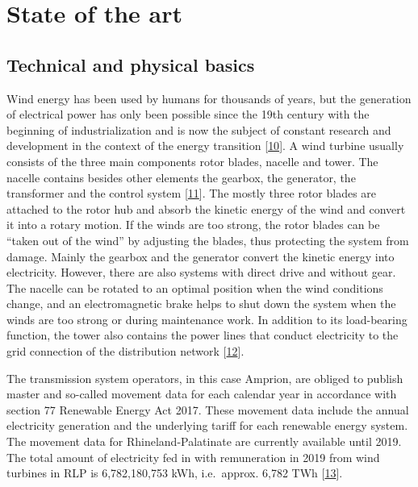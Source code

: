 \documentclass[a4paper,11pt]{article}
\begin{document}
\hypertarget{state-of-the-art}{%
\section{State of the art}\label{state-of-the-art}}

\hypertarget{technical-and-physical-basics}{%
\subsection{Technical and physical basics}\label{technical-and-physical-basics}}

Wind energy has been used by humans for thousands of years, but the generation of electrical power has only been possible since the 19th century with the beginning of industrialization and is now the subject of constant research and development in the context of the energy transition {[}\protect\hyperlink{ref-Wikipedia.2021}{10}{]}. A wind turbine usually consists of the three main components rotor blades, nacelle and tower. The nacelle contains besides other elements the gearbox, the generator, the transformer and the control system {[}\protect\hyperlink{ref-MladenBosnjakovic.2013}{11}{]}. The mostly three rotor blades are attached to the rotor hub and absorb the kinetic energy of the wind and convert it into a rotary motion. If the winds are too strong, the rotor blades can be ``taken out of the wind'' by adjusting the blades, thus protecting the system from damage. Mainly the gearbox and the generator convert the kinetic energy into electricity. However, there are also systems with direct drive and without gear. The nacelle can be rotated to an optimal position when the wind conditions change, and an electromagnetic brake helps to shut down the system when the winds are too strong or during maintenance work. In addition to its load-bearing function, the tower also contains the power lines that conduct electricity to the grid connection of the distribution network {[}\protect\hyperlink{ref-NetzKonstrukteur.16.11.2020}{12}{]}.

The transmission system operators, in this case Amprion, are obliged to publish master and so-called movement data for each calendar year in accordance with section 77 Renewable Energy Act 2017. These movement data include the annual electricity generation and the underlying tariff for each renewable energy system. The movement data for Rhineland-Palatinate are currently available until 2019. The total amount of electricity fed in with remuneration in 2019 from wind turbines in RLP is 6,782,180,753 kWh, i.e.~approx. 6,782 TWh {[}\protect\hyperlink{ref-EnergieagenturRheinlandPfalz.2019}{13}{]}.
\end{document}
